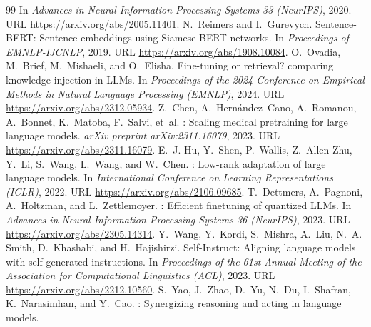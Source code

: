 {\begin{thebibliography}{99}
\newblock In \emph{Advances in Neural Information Processing Systems 33
  (NeurIPS)}, 2020.
\newblock URL \url{https://arxiv.org/abs/2005.11401}.
N.~Reimers and I.~Gurevych.
\newblock Sentence-{BERT}: Sentence embeddings using {S}iamese {BERT}-networks.
\newblock In \emph{Proceedings of EMNLP-IJCNLP}, 2019.
\newblock URL \url{https://arxiv.org/abs/1908.10084}.
O.~Ovadia, M.~Brief, M.~Mishaeli, and O.~Elisha.
\newblock Fine-tuning or retrieval? comparing knowledge injection in {LLMs}.
\newblock In \emph{Proceedings of the 2024 Conference on Empirical Methods in
  Natural Language Processing (EMNLP)}, 2024.
\newblock URL \url{https://arxiv.org/abs/2312.05934}.
Z.~Chen, A.~Hern{\'a}ndez~Cano, A.~Romanou, A.~Bonnet, K.~Matoba, F.~Salvi,
  et~al.
: Scaling medical pretraining for large language
  models.
\newblock \emph{arXiv preprint arXiv:2311.16079}, 2023.
\newblock URL \url{https://arxiv.org/abs/2311.16079}.
E.~J. Hu, Y.~Shen, P.~Wallis, Z.~Allen-Zhu, Y.~Li, S.~Wang, L.~Wang, and
  W.~Chen.
: Low-rank adaptation of large language models.
\newblock In \emph{International Conference on Learning Representations
  (ICLR)}, 2022.
\newblock URL \url{https://arxiv.org/abs/2106.09685}.
T.~Dettmers, A.~Pagnoni, A.~Holtzman, and L.~Zettlemoyer.
: Efficient finetuning of quantized {LLMs}.
\newblock In \emph{Advances in Neural Information Processing Systems 36
  (NeurIPS)}, 2023.
\newblock URL \url{https://arxiv.org/abs/2305.14314}.
Y.~Wang, Y.~Kordi, S.~Mishra, A.~Liu, N.~A. Smith, D.~Khashabi, and
  H.~Hajishirzi.
\newblock Self-{I}nstruct: Aligning language models with self-generated
  instructions.
\newblock In \emph{Proceedings of the 61st Annual Meeting of the Association
  for Computational Linguistics (ACL)}, 2023.
\newblock URL \url{https://arxiv.org/abs/2212.10560}.
S.~Yao, J.~Zhao, D.~Yu, N.~Du, I.~Shafran, K.~Narasimhan, and Y.~Cao.
: Synergizing reasoning and acting in language models.

\end{thebibliography}}

